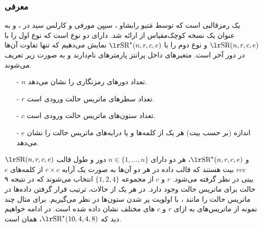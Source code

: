 \subsubsection*{معرفی }
 یک رمزقالبی است که توسط مَتیو رابشاو
 ، 
سییِن  مورفی 
 و 
 کارلس سید 
 در 
 \cite{cid2005small}، 
 و به عنوان یک نسخه کوچک‌مقیاس از 
  ارائه شد. 
  دارای دو نوع است که نوع اول را با 
$\text{\en{SR}}(n,r,c,e)$
و نوع دوم را با 
$\text{\en{SR}}^{\star}(n,r,c,e)$
نمایش می‌دهیم که تنها تفاوت آن‌ها در دور آخر است. متغیرهای داخل پرانتز پارمترهای 
نام‌دارند و به صورت زیر تعریف می‌شوند. 
\begin{itemize}
\item[-] $n$
تعداد دورهای رمزنگاری را نشان می‌دهد. 
\item[-] $r$
تعداد سطرهای ماتریس حالت ورودی است. 
\item[-] $c$ 
تعداد ستون‌های ماتریس حالت ورودی است. 
\item[-] $e$
اندازه (بر حسب بیت) هر یک از کلمه‌ها و یا درایه‌های ماتریس حالت را نشان می‌دهد. 
\end{itemize}
$\text{\en{SR}}(n,r,c,e)$
و 
$\text{\en{SR}}^{\star}(n,r,c,e)$، 
هر دو دارای 
$n\in\{1,\dots,n\}$
دور و طول قالب 
$rce$
بیت هستند که قالب داده در هر دو آن‌ها  به صورت یک آرایه 
$r\times c$
از کلمه‌های 
$e$
بیتی در نظر گرفته می‌شود. 
$r$
و 
$c$
از مجموعه‌ 
$\{1,2,4\}$
انتخاب می‌شوند که در نتیجه ۹ حالت برای ماتریس حالت وجود دارد. در هر یک از حالات، ترتیب قرار گرفتن داده‌ها در ماتریس حالت را مانند 
، 
با اولویت پر شدن ستون‌ها در نظر می‌گیریم. برای مثال چند نمونه از ماتریس‌های به ازای 
$r$
و 
$c$
های مختلف نشان داده شده است. در ادامه خواهیم دید که 
$\text{\en{SR}}^{\star}(10,4,4,8)$، 
همان 
است. 
